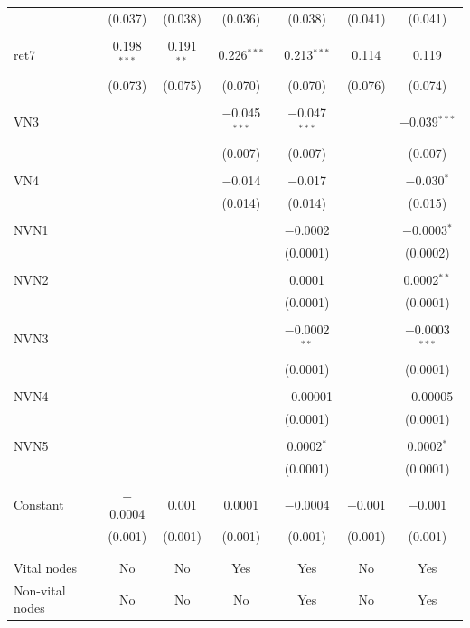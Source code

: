 \begin{table}[!htbp]
\begin{tabular}{@{\extracolsep{5pt}}lcccccc}
  & (0.037) & (0.038) & (0.036) & (0.038) & (0.041) & (0.041) \\ 
  & & & & & & \\ 
 ret7 & 0.198$^{***}$ & 0.191$^{**}$ & 0.226$^{***}$ & 0.213$^{***}$ & 0.114 & 0.119 \\ 
  & (0.073) & (0.075) & (0.070) & (0.070) & (0.076) & (0.074) \\ 
  & & & & & & \\ 
 VN3 &  &  & $-$0.045$^{***}$ & $-$0.047$^{***}$ &  & $-$0.039$^{***}$ \\ 
  &  &  & (0.007) & (0.007) &  & (0.007) \\ 
  & & & & & & \\ 
 VN4 &  &  & $-$0.014 & $-$0.017 &  & $-$0.030$^{*}$ \\ 
  &  &  & (0.014) & (0.014) &  & (0.015) \\ 
  & & & & & & \\ 
 NVN1 &  &  &  & $-$0.0002 &  & $-$0.0003$^{*}$ \\ 
  &  &  &  & (0.0001) &  & (0.0002) \\ 
  & & & & & & \\ 
 NVN2 &  &  &  & 0.0001 &  & 0.0002$^{**}$ \\ 
  &  &  &  & (0.0001) &  & (0.0001) \\ 
  & & & & & & \\ 
 NVN3 &  &  &  & $-$0.0002$^{**}$ &  & $-$0.0003$^{***}$ \\ 
  &  &  &  & (0.0001) &  & (0.0001) \\ 
  & & & & & & \\ 
 NVN4 &  &  &  & $-$0.00001 &  & $-$0.00005 \\ 
  &  &  &  & (0.0001) &  & (0.0001) \\ 
  & & & & & & \\ 
 NVN5 &  &  &  & 0.0002$^{*}$ &  & 0.0002$^{*}$ \\ 
  &  &  &  & (0.0001) &  & (0.0001) \\ 
  & & & & & & \\ 
 Constant & $-$0.0004 & 0.001 & 0.0001 & $-$0.0004 & $-$0.001 & $-$0.001 \\ 
  & (0.001) & (0.001) & (0.001) & (0.001) & (0.001) & (0.001) \\ 
  & & & & & & \\ 
\hline \\[-1.8ex] 
Vital nodes & No & No & Yes & Yes & No & Yes \\ 
Non-vital nodes & No & No & No & Yes & No & Yes \\ 

\end{tabular}
\end{table}
